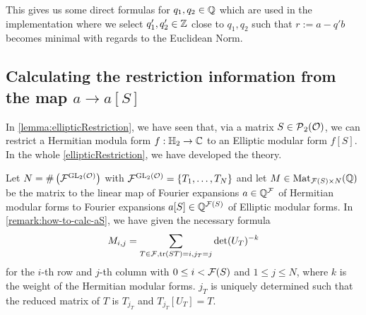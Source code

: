This gives us some direct formulas for $q_1,q_2 \in \mathbb{Q}$ which are used in the  implementation where we select $q'_1, q'_2 \in \mathbb{Z}$ close to $q_1,q_2$ such that $r := a - q' b$ becomes minimal with regards to the Euclidean Norm.


\subsection{Calculating the restriction information from the map $a \rightarrow a[S]$}
\label{impl:calcMatrix}
\label{calcMatrix}

In \cref{lemma:ellipticRestriction}, we have seen that, via a matrix $S \in \operatorname{\mathcal{P}}_2(\mathcal{O})$, we can restrict a Hermitian modula form $f : \mathbb{H}_2 \rightarrow \mathbb{C}$ to an Elliptic modular form $f[S]$. In the whole \cref{ellipticRestriction}, we have developed the theory.

Let $N = \# \left( {\mathcal{F}}^{\operatorname{GL}_2(\mathcal{O})} \right)$ with $\invarF{\F}{\GL_2(\curlO)} = \Set{T_1,\dots,T_N}$ and let $M \in \operatorname{Mat}_{\mathcal{F}(S) \times N}(\mathbb{Q})$ be the matrix to the linear map of Fourier expansions $a \in \mathbb{Q}^{\mathcal{F}}$ of Hermitian modular forms to Fourier expansions $a[S] \in \mathbb{Q}^{\mathcal{F}(S)}$ of Elliptic modular forms. In \cref{remark:how-to-calc-aS}, we have given the necessary formula
\[ M_{i,j} =  \sum_{T \in \mathcal{F}, \textup{\textrm{tr}}(S T) = i, j_T = j} \det(U_T)^{-k} \]
for the $i$-th row and $j$-th column with $0 \le i < \mathcal{F}(S)$ and $1 \le j \le N$, where $k$ is the weight of the Hermitian modular forms. $j_T$ is uniquely determined such that the reduced matrix of $T$ is $T_{j_T}$ and $T_{j_T}[U_T] = T$. 

